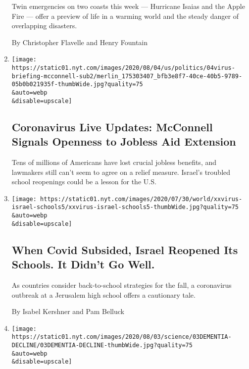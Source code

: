 \begin{enumerate}
  Twin emergencies on two coasts this week --- Hurricane Isaias and the
  Apple Fire --- offer a preview of life in a warming world and the
  steady danger of overlapping disasters.

  By Christopher Flavelle and Henry Fountain
\item
  \href{/2020/08/04/world/coronavirus-cases.html}{}

  \texttt{[image: https://static01.nyt.com/images/2020/08/04/us/politics/04virus-briefing-mcconnell-sub2/merlin\_175303407\_bfb3e8f7-40ce-40b5-9789-05b0b021935f-thumbWide.jpg?quality=75\\\&auto=webp\\\&disable=upscale]}

  \hypertarget{coronavirus-live-updates-mcconnell-signals-openness-to-jobless-aid-extension}{%
  \subsection{Coronavirus Live Updates: McConnell Signals Openness to
  Jobless Aid
  Extension}\label{coronavirus-live-updates-mcconnell-signals-openness-to-jobless-aid-extension}}

  Tens of millions of Americans have lost crucial jobless benefits, and
  lawmakers still can't seem to agree on a relief measure. Israel's
  troubled school reopenings could be a lesson for the U.S.
\item
  \href{/2020/08/04/world/middleeast/coronavirus-israel-schools-reopen.html}{}

  \texttt{[image: https://static01.nyt.com/images/2020/07/30/world/xxvirus-israel-schools5/xxvirus-israel-schools5-thumbWide.jpg?quality=75\\\&auto=webp\\\&disable=upscale]}

  \hypertarget{when-covid-subsided-israel-reopened-its-schools-it-didnt-go-well}{%
  \subsection{When Covid Subsided, Israel Reopened Its Schools. It
  Didn't Go
  Well.}\label{when-covid-subsided-israel-reopened-its-schools-it-didnt-go-well}}

  As countries consider back-to-school strategies for the fall, a
  coronavirus outbreak at a Jerusalem high school offers a cautionary
  tale.

  By Isabel Kershner and Pam Belluck
\item
  \href{/2020/08/03/health/alzheimers-dementia-rates.html}{}

  \texttt{[image: https://static01.nyt.com/images/2020/08/03/science/03DEMENTIA-DECLINE/03DEMENTIA-DECLINE-thumbWide.jpg?quality=75\\\&auto=webp\\\&disable=upscale]}


\end{enumerate}

